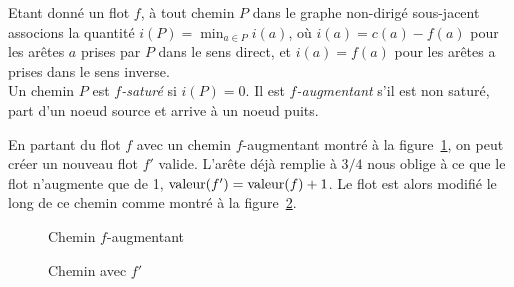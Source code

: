 \begin{mydef}
  Etant donné un flot $f$, à tout chemin $P$ dans le graphe non-dirigé sous-jacent associons la quantité $i(P) = \min_{a \in P} i(a)$, où $i(a) = c(a) − f(a)$ pour les arêtes $a$ prises par $P$ dans le sens direct, et $i(a) = f (a)$ pour les arêtes a prises dans le sens inverse.\\
  Un chemin $P$ est \emph{$f$-saturé} si $i(P) = 0$. Il est \emph{$f$-augmentant} s'il est non saturé, part d'un noeud source et arrive à un noeud puits.
\end{mydef}

\begin{myexem}
  En partant du flot $f$ avec un chemin $f$-augmentant
  montré à la figure~\ref{fig:faug},
  on peut créer un nouveau flot $f'$ valide.
  L'arête déjà remplie à $3/4$ nous oblige à ce que le flot n'augmente que de 1,
  $\operatorname{valeur}(f') = \operatorname{valeur}(f) + 1$.
  Le flot est alors modifié le long de ce chemin comme montré
  à la figure~\ref{fig:fprime}.
  \begin{figure}[!h]
    \centering
    \caption{Chemin $f$-augmentant}
    \label{fig:faug}
  \end{figure}
  \begin{figure}[!h]
    \centering
    \caption{Chemin avec $f'$}
    \label{fig:fprime}
  \end{figure}
\end{myexem}

